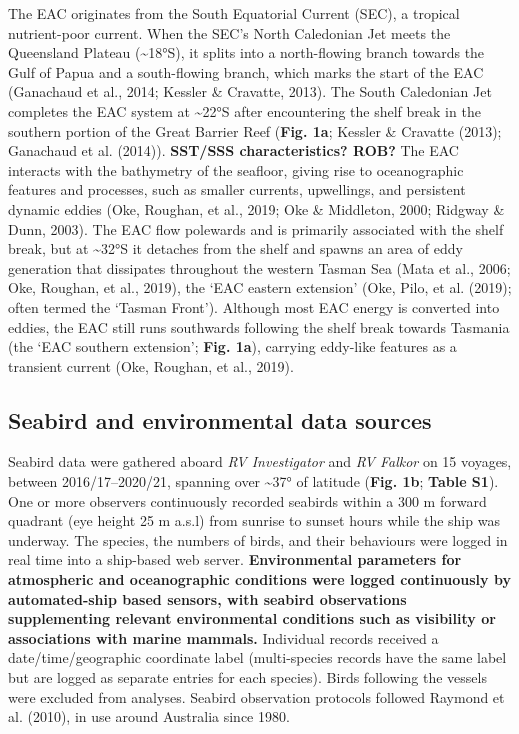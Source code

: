\documentclass{article}
\begin{document}
The EAC originates from the South Equatorial Current (SEC), a tropical
nutrient-poor current. When the SEC's North Caledonian Jet meets the
Queensland Plateau (\textasciitilde18°S), it splits into a north-flowing
branch towards the Gulf of Papua and a south-flowing branch, which marks
the start of the EAC (Ganachaud et al., 2014; Kessler \& Cravatte,
2013). The South Caledonian Jet completes the EAC system at
\textasciitilde22°S after encountering the shelf break in the southern
portion of the Great Barrier Reef (\textbf{Fig. 1a}; Kessler \& Cravatte
(2013); Ganachaud et al. (2014)). \textbf{SST/SSS characteristics? ROB?}
The EAC interacts with the bathymetry of the seafloor, giving rise to
oceanographic features and processes, such as smaller currents,
upwellings, and persistent dynamic eddies (Oke, Roughan, et al., 2019;
Oke \& Middleton, 2000; Ridgway \& Dunn, 2003). The EAC flow polewards
and is primarily associated with the shelf break, but at
\textasciitilde32°S it detaches from the shelf and spawns an area of
eddy generation that dissipates throughout the western Tasman Sea (Mata
et al., 2006; Oke, Roughan, et al., 2019), the `EAC eastern extension'
(Oke, Pilo, et al. (2019); often termed the `Tasman Front'). Although
most EAC energy is converted into eddies, the EAC still runs southwards
following the shelf break towards Tasmania (the `EAC southern
extension'; \textbf{Fig. 1a}), carrying eddy-like features as a
transient current (Oke, Roughan, et al., 2019).

\hypertarget{seabird-and-environmental-data-sources}{%
\subsection{Seabird and environmental data
sources}\label{seabird-and-environmental-data-sources}}

Seabird data were gathered aboard \emph{RV Investigator} and \emph{RV
Falkor} on 15 voyages, between 2016/17--2020/21, spanning over
\textasciitilde37° of latitude (\textbf{Fig. 1b}; \textbf{Table S1}).
One or more observers continuously recorded seabirds within a 300 m
forward quadrant (eye height 25 m a.s.l) from sunrise to sunset hours
while the ship was underway. The species, the numbers of birds, and
their behaviours were logged in real time into a ship-based web server.
\textbf{Environmental parameters for atmospheric and oceanographic
conditions were logged continuously by automated-ship based sensors,
with seabird observations supplementing relevant environmental
conditions such as visibility or associations with marine mammals.}
Individual records received a date/time/geographic coordinate label
(multi-species records have the same label but are logged as separate
entries for each species). Birds following the vessels were excluded
from analyses. Seabird observation protocols followed Raymond et al.
(2010), in use around Australia since 1980.
\end{document}
